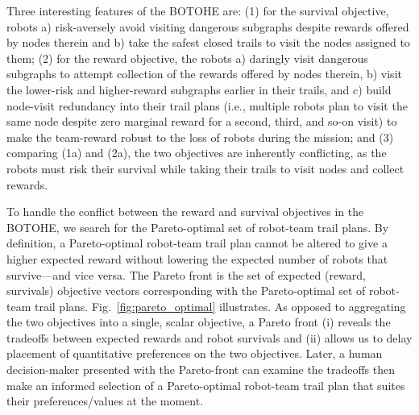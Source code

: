 \documentclass[fleqn,10pt,lineno]{wlpeerj}
\begin{document}
Three interesting features of the BOTOHE are: 
(1) for the survival objective, robots a) risk-aversely avoid visiting dangerous subgraphs despite rewards offered by nodes therein and b) take the safest closed trails to visit the nodes assigned to them;
(2) for the reward objective, the robots a) daringly visit dangerous subgraphs to attempt collection of the rewards offered by nodes therein, b) visit the lower-risk and higher-reward subgraphs earlier in their trails, and c) build node-visit redundancy into their trail plans (i.e., multiple robots plan to visit the same node despite zero marginal reward for a second, third, and so-on visit) to make the team-reward robust to the loss of robots during the mission; and
(3) comparing (1a) and (2a), the two objectives are inherently conflicting, as the robots must risk their survival while taking their trails to visit nodes and collect rewards.%

To handle the conflict between the reward and survival objectives in the BOTOHE, we search for the Pareto-optimal set \cite{pardalos2017non,branke2008multiobjective} of robot-team trail plans. By definition, a Pareto-optimal robot-team trail plan cannot be altered to give a higher expected reward without lowering the expected number of robots that survive---and vice versa. The Pareto front is the set of expected (reward, survivals) objective vectors corresponding with the Pareto-optimal set of robot-team trail plans.
Fig.~\ref{fig:pareto_optimal} illustrates.
As opposed to aggregating the two objectives into a single, scalar objective, a Pareto front (i) reveals the tradeoffs between expected rewards and robot survivals and (ii) allows us to delay placement of quantitative preferences on the two objectives.
Later, a human decision-maker presented with the Pareto-front can examine the tradeoffs then make an informed selection of a Pareto-optimal robot-team trail plan that suites their preferences/values at the moment.
\end{document}

